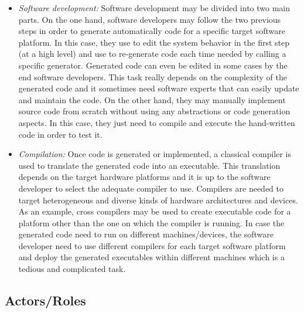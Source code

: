 \begin{itemize}

\item \textit{Software development:}
Software development may be divided into two main parts. On the one hand, software developers may follow the two previous steps in order to generate automatically code for a specific target software platform. In this case, they use to edit the system behavior in the first step (at a high level) and use to re-generate code each time needed by calling a specific generator. Generated code can even be edited in some cases by the end software developers. This task really depends on the complexity of the generated code and it sometimes need software experts that can easily update and maintain the code. On the other hand, they may manually implement source code from scratch without using any abstractions or code generation aspects. In this case, they just need to compile and execute the hand-written code in order to test it.
\item \textit{Compilation:}
Once code is generated or implemented, a classical compiler is used to translate the generated code into an executable. This translation depends on the target hardware platforms and it is up to the software developer to select the adequate compiler to use. Compilers are needed to target heterogeneous and diverse kinds of hardware architectures and devices. As an example, cross compilers may be used to create executable code for a platform other than the one on which the compiler is running. In case the generated code need to run on different machines/devices, the software developer need to use different compilers for each target software platform and deploy the generated executables within different machines which is a tedious and complicated task.
\end{itemize} 
\subsection{Actors/Roles}
